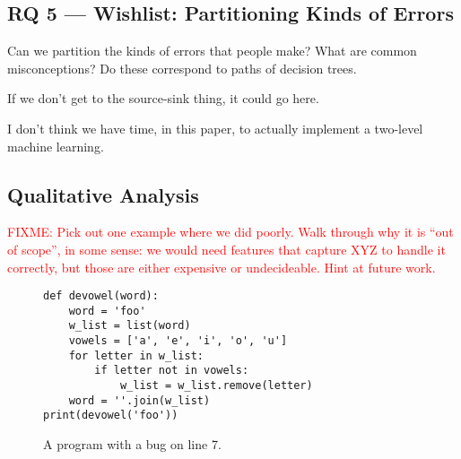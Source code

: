 \documentclass[conference]{IEEEtran}
\newcommand{\fixme}[1]{\textcolor{red}{FIXME: #1}}
\begin{document}
\subsection{RQ 5 --- Wishlist: Partitioning Kinds of Errors}

Can we partition the kinds of errors that people make? What are common
misconceptions? Do these correspond to paths of decision trees.

If we don't get to the source-sink thing, it could go here.

I don't think we have time, in this paper, to actually implement a
two-level machine learning.

\subsection{Qualitative Analysis}

\fixme{
Pick out one example where we did poorly. Walk through why it is ``out of
scope'', in some sense: we would need features that capture XYZ to handle
it correctly, but those are either expensive or undecideable. Hint at
future work.
}

%
%
%
%
%
%

\begin{figure}
\begin{lstlisting}
def devowel(word):
    word = 'foo'
    w_list = list(word)
    vowels = ['a', 'e', 'i', 'o', 'u']
    for letter in w_list:
        if letter not in vowels:
            w_list = w_list.remove(letter)
    word = ''.join(w_list)
print(devowel('foo'))
\end{lstlisting}
\caption{A program with a bug on line 7.}
\label{fig-win-example-one}
\end{figure}

\end{document}
